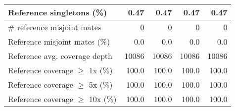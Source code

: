 \documentclass[12pt,a4paper]{article}
\begin{document}
\begin{table}[ht]
\begin{center}
\begin{tabular}{|l*{4}{|r}|}
Reference singletons (\%) & 0.47 & 0.47 & 0.47 & 0.47 \\ \hline
\# reference misjoint mates & 0 & 0 & 0 & 0 \\ \hline
Reference misjoint mates (\%) & 0.0 & 0.0 & 0.0 & 0.0 \\ \hline
Reference avg. coverage depth & 10086 & 10086 & 10086 & 10086 \\ \hline
Reference coverage $\geq$ 1x (\%) & 100.0 & 100.0 & 100.0 & 100.0 \\ \hline
Reference coverage $\geq$ 5x (\%) & 100.0 & 100.0 & 100.0 & 100.0 \\ \hline
Reference coverage $\geq$ 10x (\%) & 100.0 & 100.0 & 100.0 & 100.0 \\ \hline
\end{tabular}
\end{center}
\end{table}
\end{document}
